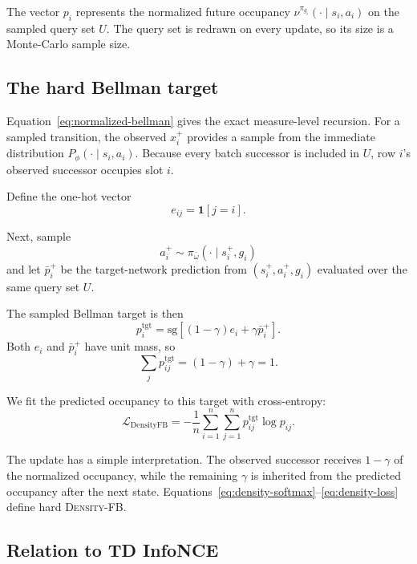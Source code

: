 \documentclass{article}
\newcommand{\ind}[1]{\mathbf{1}\!\left[#1\right]}
\newcommand{\sg}{\mathrm{sg}}
\newcommand{\DensityFB}{\textsc{Density-FB}}
\begin{document}
The vector $p_i$ represents the normalized future occupancy
$\nu^{\pi_{g_i}}(\cdot\mid s_i,a_i)$ on the sampled query set $U$.
The query set is redrawn on every update, so its size is a Monte-Carlo sample size.

\subsection{The hard Bellman target}

Equation~\ref{eq:normalized-bellman} gives the exact measure-level recursion.
For a sampled transition, the observed $x_i^+$ provides a sample from the immediate distribution $P_\phi(\cdot\mid s_i,a_i)$.
Because every batch successor is included in $U$, row $i$'s observed successor occupies slot $i$.

Define the one-hot vector
\begin{equation}
    e_{ij} = \ind{j=i}.
\end{equation}

Next, sample
\begin{equation}
a_i^+
\sim
\pi_{\bar\omega}(\cdot\mid s_i^+,g_i)
\end{equation}
and let $\bar p_i^+$ be the target-network prediction from $(s_i^+,a_i^+,g_i)$ evaluated over the same query set $U$.

The sampled Bellman target is then
\begin{equation}
\label{eq:hard-target}
    p_i^{\mathrm{tgt}} = \sg\left[ (1-\gamma)e_i + \gamma\bar p_i^+ \right].
\end{equation}
Both $e_i$ and $\bar p_i^+$ have unit mass, so
\begin{equation}
    \sum_j p_{ij}^{\mathrm{tgt}} = (1-\gamma)+\gamma = 1.
\end{equation}

We fit the predicted occupancy to this target with cross-entropy:
\begin{equation}
\label{eq:density-loss}
\mathcal L_{\mathrm{DensityFB}} = - \frac1n \sum_{i=1}^n \sum_{j=1}^n p_{ij}^{\mathrm{tgt}} \log p_{ij}.
\end{equation}

The update has a simple interpretation.
The observed successor receives $1-\gamma$ of the normalized occupancy, while the remaining $\gamma$ is inherited from the predicted occupancy after the next state.
Equations~\ref{eq:density-softmax}--\ref{eq:density-loss} define hard \DensityFB{}.

\subsection{Relation to TD InfoNCE}
\label{sec:tdinfonce}
\end{document}
